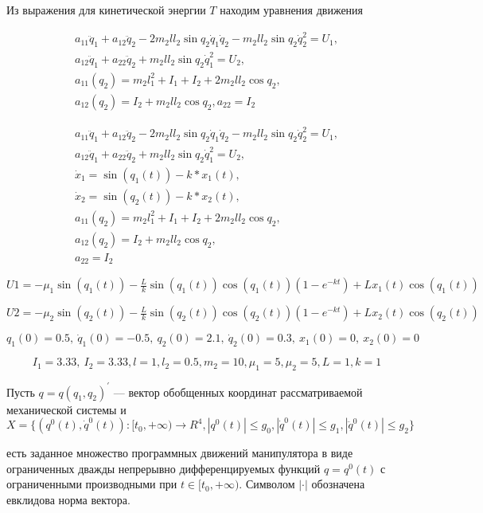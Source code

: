 Из выражения для кинетической энергии $T$ находим уравнения движения

\begin{equation}
\begin{array}{l}
a_{11} \ddot q_1 + a_{12} \ddot q_2 - 2 m_2 l l_2 \sin q_2 \dot q_1 \dot q_2 - m_2 l l_2 \sin q_2 \dot q_2^2 = U_1,\\ 
a_{12} \ddot q_1 + a_{22} \ddot q_2 + m_2 l l_2 \sin q_2 \dot q_1^2 = U_2,\\
a_{11} (q_2) = m_2 l_1^2 + I_1 + I_2 + 2 m_2 l l_2 \cos q_2,\\
a_{12} (q_2)= I_2 + m_2 l l_2 \cos q_2, a_{22} = I_2
\end{array}
\end{equation}

\begin{equation}
\begin{array}{l}
	a_{11} \ddot q_1 + a_{12} \ddot q_2 - 2 m_2 l l_2 \sin q_2 \dot q_1 \dot q_2 - m_2 l l_2 \sin q_2 \dot q_2^2 = U_1,\\ 
	a_{12} \ddot q_1 + a_{22} \ddot q_2 + m_2 l l_2 \sin q_2 \dot q_1^2 = U_2,\\
	\dot x_1 = \sin(q_1(t)) - k * x_1(t), \\ 
	\dot x_2 = \sin(q_2(t)) - k * x_2(t), \\ 
	a_{11} (q_2) = m_2 l_1^2 + I_1 + I_2 + 2 m_2 l l_2 \cos q_2,\\
	a_{12} (q_2)= I_2 + m_2 l l_2 \cos q_2,\\ 
	a_{22} = I_2
\end{array}
\end{equation}

$U1 = -\mu_1 \sin(q_1(t)) - \frac{L}{k} \sin(q_1(t)) \cos(q_1(t)) (1 - e^{- k t}) + L x_1(t) \cos(q_1(t))$

$U2 = -\mu_2 \sin(q_2(t)) - \frac{L}{k} \sin(q_2(t)) \cos(q_2(t)) (1 - e^{- k t}) + L x_2(t) \cos(q_2(t))$

$q_1(0) = 0.5, \ \dot q_1(0) = -0.5, \ q_2(0) = 2.1, \ \dot q_2(0) = 0.3, \ x_1(0) = 0, \ x_2(0) = 0$

$$ I_1 = 3.33, \ I_2 = 3.33,  l = 1,  l_2 = 0.5,  m_2 = 10, \mu_1 = 5,  \mu_2 = 5, L = 1,  k = 1$$

Пусть $q=q(q_1, q_2)^{'}$ --– вектор обобщенных координат рассматриваемой механической системы и 
$$X = \{(q^0(t), \dot q^0(t)) : [t_0, + \infty) \to R^4, \left|q^0(t)\right| \le g_0, \left|\dot q^0(t) \right| \le g_1, \left|\ddot q^0(t)\right| \le g_2 \}$$

есть заданное множество программных движений манипулятора в виде ограниченных дважды непрерывно дифференцируемых функций $q=q^0(t)$ с ограниченными производными при $t \in [t_0, + \infty).$ Символом $\left| \cdot \right|$   обозначена евклидова норма вектора.

